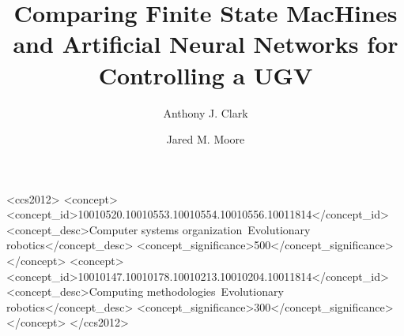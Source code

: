 \documentclass[sigconf,natbib=false]{acmart}
\begin{document}
\title{Comparing Finite State MacHines and Artificial Neural Networks for Controlling a UGV}


\author{Anthony J. Clark}

\author{Jared M. Moore}




%
%
\begin{CCSXML}
<ccs2012>
<concept>
<concept_id>10010520.10010553.10010554.10010556.10011814</concept_id>
<concept_desc>Computer systems organization~Evolutionary robotics</concept_desc>
<concept_significance>500</concept_significance>
</concept>
<concept>
<concept_id>10010147.10010178.10010213.10010204.10011814</concept_id>
<concept_desc>Computing methodologies~Evolutionary robotics</concept_desc>
<concept_significance>300</concept_significance>
</concept>
</ccs2012>
\end{CCSXML}



\maketitle


% 
% 
% 
% 
% 
% 

\printbibliography
\end{document}
